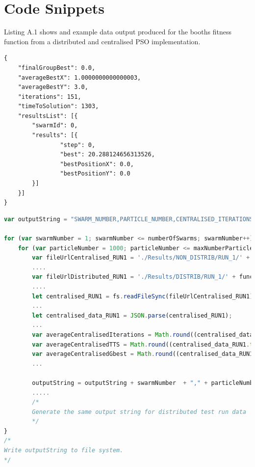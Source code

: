 \documentclass[oneside,12pt]{book}
\begin{document}


\appendix
\chapter{Code Snippets}
Listing A.1 shows and example data output produced for the booths fitness function from a distributed and centralised PSO implementation. 
\begin{lstlisting}
{
	"finalGroupBest": 0.0,
	"averageBestX": 1.0000000000000003,
	"averageBestY": 3.0,
	"iterations": 151,
	"timeToSolution": 1303,
	"resultsList": [{
		"swarmId": 0,
		"results": [{
				"step": 0,
				"best": 20.288124656313526,
				"bestPositionX": 0.0,
				"bestPositionY": 0.0
		}]
	}]
}
\end{lstlisting}

\begin{lstlisting}[basicstyle=\footnotesize, language=JavaScript]
var outputString = "SWARM_NUMBER,PARTICLE_NUMBER,CENTRALISED_ITERATIONS,CENTRALISED_TIME_TO_SOLUTION,CENTRALISED_FINAL_GROUP_BEST,DISTRIBUTED_ITERATIONS,DISTRIBUTED_TIME_TO_SOLUTION,DISTRIBUTED_FINAL_GROUP_BEST\n";

for (var swarmNumber = 1; swarmNumber <= numberOfSwarms; swarmNumber++) {
    for (var particleNumber = 1000; particleNumber <= maxNumberParticles; particleNumber += particleIncrement) {
        var fileUrlCentralised_RUN1 = './Results/NON_DISTRIB/RUN_1/' + functionName + '/' + functionName + '_' + swarmNumber + '_' + particleNumber + '.result.json';
        ....
        var fileUrlDistributed_RUN1 = './Results/DISTRIB/RUN_1/' + functionName + '/' + functionName + '_' + swarmNumber + '_' + particleNumber + '.result.json';
        ....
        let centralised_RUN1 = fs.readFileSync(fileUrlCentralised_RUN1);
        ...
        let centralised_data_RUN1 = JSON.parse(centralised_RUN1);
        ...
        var averageCentralisedIterations = Math.round((centralised_data_RUN1.iterations + centralised_data_RUN2.iterations + centralised_data_RUN3.iterations)/3);
        var averageCentralisedTTS = Math.round((centralised_data_RUN1.timeToSolution + centralised_data_RUN2.timeToSolution + centralised_data_RUN3.timeToSolution)/3);
        var averageCentralisedGbest = Math.round((centralised_data_RUN1.finalGroupBest + centralised_data_RUN2.finalGroupBest + centralised_data_RUN3.finalGroupBest)/3);
        ...

        outputString = outputString + swarmNumber  + "," + particleNumber + "," + averageCentralisedIterations + "," + averageCentralisedTTS + "," + averageCentralisedGbest + ",";
        .....
        /*
        Generate the same output string for distributed test run data
        */
}
/*
Write outputString to file system. 
*/
\end{lstlisting}
\label{listing:DataAggregation}
\end{document}
